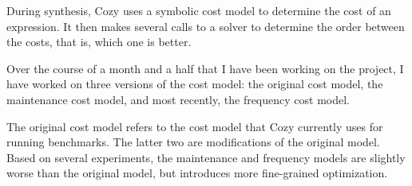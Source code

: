 During synthesis, Cozy uses a symbolic cost model to determine the cost of an
expression. It then makes several calls to a solver to determine the order
between the costs, that is, which one is better.

Over the course of a month and a half that I have been working on the project, 
I have worked on three versions of the cost model: the original cost model, the
maintenance cost model, and most recently, the frequency cost model. 

The original cost model refers to the cost model that Cozy currently uses for
running benchmarks. The latter two are modifications of the original model.
Based on several experiments, the maintenance and frequency models are slightly
worse than the original model, but introduces more fine-grained optimization. 
